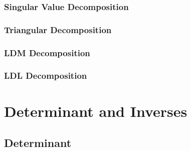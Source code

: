 \documentclass[oneside]{book}
\begin{document}
\subsection{Singular Value Decomposition}
\subsection{Triangular Decomposition}
\subsection{LDM Decomposition}
\subsection{LDL Decomposition}




\chapter{Determinant and Inverses}

\section{Determinant}
\end{document}
